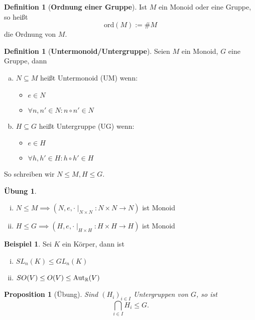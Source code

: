 \documentclass[a4paper]{report}
\theoremstyle{plain}
\newtheorem{prop}[thm]{Proposition}
\theoremstyle{definition}
\newtheorem{defi}[thm]{Definition}
\newtheorem*{bsp*}{Beispiel}
\newtheorem{ubng}[thm]{Übung}
\begin{document}
\begin{defi}[\textbf{Ordnung einer Gruppe}]
  Ist $M$ ein Monoid oder eine Gruppe, so heißt $$\mathrm{ord}(M):=\#M$$
  die Ordnung von $M$.
\end{defi}

\begin{defi}[\textbf{Untermonoid/Untergruppe}]
  Seien $M$ ein Monoid, $G$ eine Gruppe, dann
  \begin{enumerate}[(a)] %
    \item $N \subseteq M$ heißt Untermonoid (UM) wenn:
          \begin{itemize}
            \item $e \in N$
            \item $\forall n, n' \in N : n \circ n' \in N$
          \end{itemize}
    \item $H \subseteq G$ heißt Untergruppe (UG) wenn:
          \begin{itemize}
            \item $e \in H$
            \item $\forall h, h' \in H : h \circ h' \in H$
          \end{itemize}
  \end{enumerate}

So schreiben wir $N \leq M, H \leq G$.
\end{defi}

\begin{ubng}%
  \begin{enumerate}[(i)] %
    \item $N \leq M \implies (N, e, \cdot \mid_{N \times N}:N\times N \to N)$ ist Monoid
    \item $H \leq G \implies (H, e, \cdot \mid_{H \times H}:H\times H \to H)$ ist Monoid
  \end{enumerate}

\end{ubng}
\begin{bsp*}
  Sei $K$ ein Körper, dann ist
  \begin{enumerate}[(i)] %
    \item $SL_{n}(K) \leq GL_{n}(K)$
    \item $SO(V) \leq O(V) \le \mathrm{Aut}_{\Bbb R}(V)$
  \end{enumerate}
\end{bsp*}

\begin{prop}[Übung]
Sind $(H_{i})_{i \in I}$ Untergruppen von $G$, so ist
$$\bigcap_{i \in I} H_{i} \leq G.$$
\end{prop}
\end{document}
